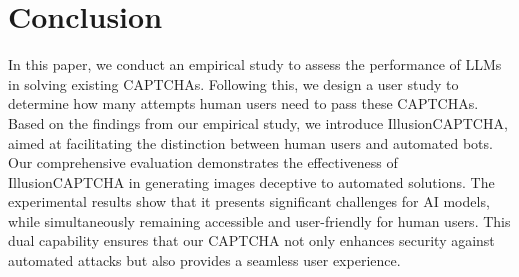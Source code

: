 \section{Conclusion}
In this paper, we conduct an empirical study to assess the performance of LLMs in solving existing CAPTCHAs. Following this, we design a user study to determine how many attempts human users need to pass these CAPTCHAs. Based on the findings from our empirical study, we introduce IllusionCAPTCHA, aimed at facilitating the distinction between human users and automated bots.
Our comprehensive evaluation demonstrates the effectiveness of IllusionCAPTCHA in generating images deceptive to automated solutions. 
The experimental results show that it presents significant challenges for AI models, while simultaneously remaining accessible and user-friendly for human users. This dual capability ensures that our CAPTCHA not only enhances security against automated attacks but also provides a seamless user experience.

